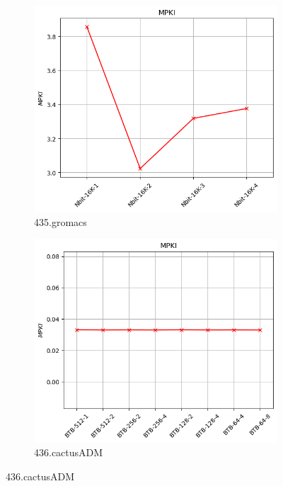 \documentclass{article}
\begin{document}
\begin{figure}[H]
    \vspace{0.5cm} %

    \begin{subfigure}[b]{0.45\textwidth}
        \includegraphics[width=\textwidth]{figures/5_3/435.gromacs.cslab_branch_preds_ref.out.png}
        \caption{435.gromacs}
        \label{fig:plot55}
    \end{subfigure}
    \hfill
    \begin{subfigure}[b]{0.45\textwidth}
        \includegraphics[width=\textwidth]{figures/5_4/436.cactusADM.cslab_branch_preds_ref.out.png}
        \caption{436.cactusADM}
        \label{fig:plot56}
    \end{subfigure}


\end{figure}
\end{document}
